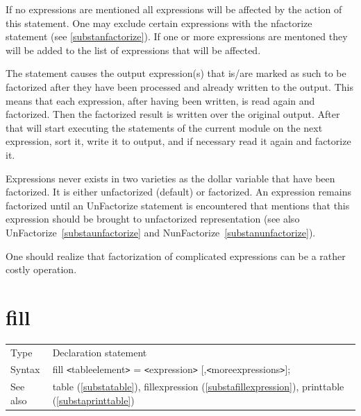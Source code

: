 \noindent If no expressions are mentioned all expressions will be affected 
by the action of this statement. One may exclude certain expressions with 
the nfactorize statement (see \ref{substanfactorize}). If one or more 
expressions are mentoned they will be added to the list of expressions that 
will be affected.

\noindent The statement causes the output expression(s) that is/are marked 
as such to be factorized after they have been processed and already written 
to the output. This means that each expression, after having been written, 
is read again and factorized. Then the factorized result is written over 
the original output. After that \FORM{} will start executing the statements of 
the current module on the next expression, sort it, write it to output, and 
if necessary read it again and factorize it.

\noindent Expressions never exists in two varieties as the dollar variable 
that have been factorized. It is either unfactorized (default) or 
factorized. An expression remains factorized until an UnFactorize 
statement is encountered that mentions that this expression should be 
brought to unfactorized representation (see also 
UnFactorize~\ref{substaunfactorize} and 
NunFactorize~\ref{substanunfactorize}).

\noindent One should realize that factorization of complicated expressions 
can be a rather costly operation.

\vspace{10mm}


\section{fill}
\label{substafill}

\noindent \begin{tabular}{ll}
Type & Declaration statement\\
Syntax & fill {\tt<}tableelement{\tt>} = {\tt<}expression{\tt>} [,{\tt<}moreexpressions{\tt>}];
\\ See also & table (\ref{substatable}), 
                fillexpression (\ref{substafillexpression}),
                printtable (\ref{substaprinttable})
\end{tabular} \vspace{4mm}

